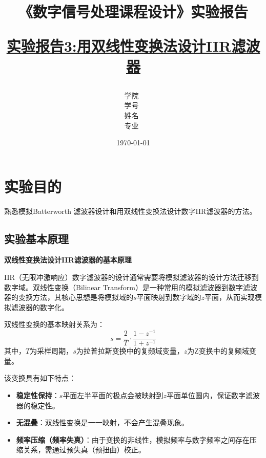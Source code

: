 \documentclass[12pt,hyperref,a4paper,UTF8]{ctexart}
\title{ 
        \vspace{1cm}
        \heiti \Huge \textbf{《数字信号处理课程设计》实验报告} \par
        \vspace{1cm} 
        \heiti \Large {\underline{实验报告3:用双线性变换法设计IIR滤波器}   } 
        \vspace{3cm}
    
    }
\author{
        \vspace{0.5cm}
        \kaishu\Large 学院\ \dlmu[9cm]{卓越学院} \\ %
        \vspace{0.5cm}
        \kaishu\Large 学号\ \dlmu[9cm]{23040447} \\ %
        \vspace{0.5cm}
        \kaishu\Large 姓名\ \dlmu[9cm]{陈文轩} \qquad  \\ %
        \vspace{0.5cm}
        \kaishu\Large 专业\ \dlmu[9cm]{智能硬件与系统(电子信息工程)} \qquad \\ %
    }
\date{\today} %
\begin{document}
\cover
\thispagestyle{empty} %







\newpage
\setcounter{page}{1} %

\section{实验目的}

熟悉模拟Batterworth 滤波器设计和用双线性变换法设计数字IIR滤波器的方法。

\subsection{实验基本原理}

\textbf{双线性变换法设计IIR滤波器的基本原理}

IIR（无限冲激响应）数字滤波器的设计通常需要将模拟滤波器的设计方法迁移到数字域。双线性变换（Bilinear Transform）是一种常用的模拟滤波器到数字滤波器的变换方法，其核心思想是将模拟域的$s$平面映射到数字域的$z$平面，从而实现模拟滤波器的数字化。

双线性变换的基本映射关系为：
\begin{equation}
    s = \frac{2}{T} \cdot \frac{1 - z^{-1}}{1 + z^{-1}}
\end{equation}
其中，$T$为采样周期，$s$为拉普拉斯变换中的复频域变量，$z$为Z变换中的复频域变量。

该变换具有如下特点：
\begin{itemize}
    \item \textbf{稳定性保持}：$s$平面左半平面的极点会被映射到$z$平面单位圆内，保证数字滤波器的稳定性。
    \item \textbf{无混叠}：双线性变换是一一映射，不会产生混叠现象。
    \item \textbf{频率压缩（频率失真）}：由于变换的非线性，模拟频率与数字频率之间存在压缩关系，需通过预失真（预扭曲）校正。
\end{itemize}
\end{document}
